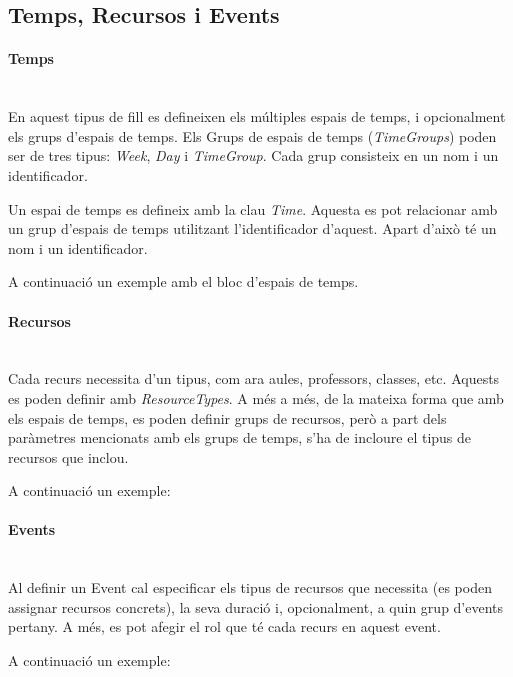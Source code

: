 \documentclass[11pt,a4paper,twoside]{report}
\begin{document}
  \subsection{Temps, Recursos i Events}
  \paragraph*{Temps}~\\
  En aquest tipus de fill es defineixen els múltiples espais de temps, i opcionalment els grups d'espais de temps. Els Grups de espais de temps (\textit{TimeGroups}) poden ser de tres tipus: 
  \textit{Week}, \textit{Day} i \textit{TimeGroup}. Cada grup consisteix en un nom i un identificador.
  
  Un espai de temps es defineix amb la clau \textit{Time}. Aquesta es pot relacionar amb un grup d'espais de temps utilitzant l'identificador d'aquest. Apart d'això té un nom i un identificador.

  A continuació un exemple amb el bloc d'espais de temps.

  


  \paragraph*{Recursos}~\\
  Cada recurs necessita d'un tipus, com ara aules, professors, classes, etc. Aquests es poden definir amb \textit{ResourceTypes}. A més a més, de la mateixa forma que amb els espais de temps, es poden definir grups de recursos, però a part dels paràmetres mencionats amb els grups de temps, s'ha de incloure el tipus de recursos que inclou. 

  A continuació un exemple:

  

  \paragraph*{Events}~\\
  Al definir un Event cal especificar els tipus de recursos que necessita (es poden assignar recursos concrets), la seva duració i, opcionalment, a quin grup d'events pertany. A més, es pot afegir el rol que té cada recurs en aquest event.

  A continuació un exemple:

  
\end{document}
